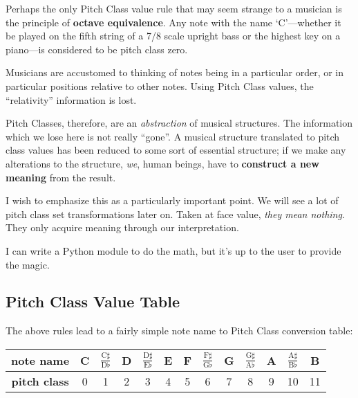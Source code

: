 \documentclass[letterpaper,12pt,oneside]{book}
\begin{document}
Perhaps the only Pitch Class value rule that may seem strange to a
musician is the principle of {\bf octave equivalence}. Any note with
the name `C'---whether it be played on the fifth string of a 7/8 scale
upright bass or the highest key on a piano---is considered to be pitch
class zero.

Musicians are accustomed to thinking of notes being in a particular
order, or in particular positions relative to other notes. Using Pitch
Class values, the ``relativity'' information is lost.

Pitch Classes, therefore, are an {\em abstraction} of musical
structures.  The information
which we lose here is not really ``gone''. A musical structure
translated to pitch class values has been reduced to some sort of
essential structure; if we make any alterations to the structure, {\em
we}, human beings, have to {\bf construct a new meaning} from the
result.

I wish to emphasize this as a particularly important point. We will
see a lot of pitch class set transformations later on. Taken at face
value, {\em they mean nothing}. They only acquire meaning through our
interpretation.

I can write a Python module to do the math, but it's up to the user to
provide the magic.


\subsection{Pitch Class Value Table}

The above rules lead to a fairly simple note name to Pitch Class
conversion table:

\begin{center}
\begin{tabular}{|c|c|c|c|c|c|c|c|c|c|c|c|c|}
\hline
\rule[-3mm]{0mm}{8mm}
{\bf note name} &
C &
$\frac{\mathrm{C}\sharp}{\mathrm{D}\flat}$ &
D &
$\frac{\mathrm{D}\sharp}{\mathrm{E}\flat}$ &
E &
F &
$\frac{\mathrm{F}\sharp}{\mathrm{G}\flat}$ &
G &
$\frac{\mathrm{G}\sharp}{\mathrm{A}\flat}$ &
A &
$\frac{\mathrm{A}\sharp}{\mathrm{B}\flat}$ &
B \\
\hline
\rule[-3mm]{0mm}{8mm}
{\bf pitch class} &
0 & 1 & 2 & 3 &
4 & 5 & 6 & 7 &
8 & 9 & 10 & 11 \\
\hline
\end{tabular}
\end{center}
\end{document}
